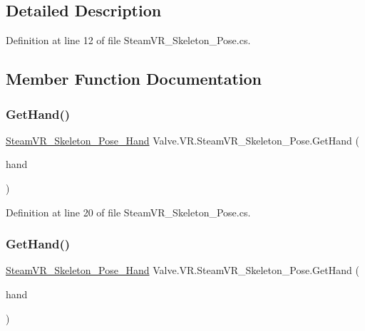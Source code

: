 \subsection{Detailed Description}


Definition at line 12 of file Steam\+V\+R\+\_\+\+Skeleton\+\_\+\+Pose.\+cs.



\subsection{Member Function Documentation}
\mbox{\label{class_valve_1_1_v_r_1_1_steam_v_r___skeleton___pose_a2b63084089cecb2cc7a1435f1817b2e7}} 
\subsubsection{\texorpdfstring{GetHand()}{GetHand()}\hspace{0.1cm}{\footnotesize\ttfamily [1/2]}}
{\footnotesize\ttfamily \mbox{\hyperlink{class_valve_1_1_v_r_1_1_steam_v_r___skeleton___pose___hand}{Steam\+V\+R\+\_\+\+Skeleton\+\_\+\+Pose\+\_\+\+Hand}} Valve.\+V\+R.\+Steam\+V\+R\+\_\+\+Skeleton\+\_\+\+Pose.\+Get\+Hand (\begin{DoxyParamCaption}\item[{int}]{hand }\end{DoxyParamCaption})}



Definition at line 20 of file Steam\+V\+R\+\_\+\+Skeleton\+\_\+\+Pose.\+cs.

\mbox{\label{class_valve_1_1_v_r_1_1_steam_v_r___skeleton___pose_adb73696e3f395f3f7127ac6844879908}} 
\subsubsection{\texorpdfstring{GetHand()}{GetHand()}\hspace{0.1cm}{\footnotesize\ttfamily [2/2]}}
{\footnotesize\ttfamily \mbox{\hyperlink{class_valve_1_1_v_r_1_1_steam_v_r___skeleton___pose___hand}{Steam\+V\+R\+\_\+\+Skeleton\+\_\+\+Pose\+\_\+\+Hand}} Valve.\+V\+R.\+Steam\+V\+R\+\_\+\+Skeleton\+\_\+\+Pose.\+Get\+Hand (\begin{DoxyParamCaption}\item[{\mbox{\hyperlink{namespace_valve_1_1_v_r_a82e5bf501cc3aa155444ee3f0662853f}{Steam\+V\+R\+\_\+\+Input\+\_\+\+Sources}}}]{hand }\end{DoxyParamCaption})}



